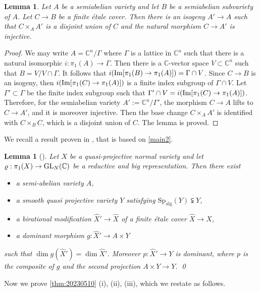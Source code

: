 \documentclass[11pt,english]{smfart}
\theoremstyle{plain}
\newtheorem{lem}[thm]{Lemma}
\theoremstyle{definition}
\theoremstyle{remark}
\numberwithin{equation}{subsection}
\theoremstyle{plain}
\newcommand{\bC}{\mathbb{C}}
\newcommand{\Spalg}{\mathrm{Sp}_{\mathrm{alg}}}
\begin{document}
\begin{lem}\label{lem:finite cover}
	Let $A$ be a semiabelian variety and let $B$ be a semiabelian subvariety of $A$. Let  $C\to B$ be a finite \'etale cover.  Then there is an isogeny $A'\to A$ such that   $C\times_AA'$ is a disjoint union of $C$ and the natural morphism $C\to A'$ is injective. 
\end{lem}
\begin{proof}
	We may write $A=\bC^n/\Gamma$ where $\Gamma$ is a lattice in $\bC^n$ such that there is a natural isomorphic $i: \pi_1(A)\to \Gamma$. Then there is a $\bC$-vector space $V\subset \bC^n$ such that $B=V/V\cap \Gamma$. It follows that $i({\rm Im}[\pi_1(B)\to \pi_1(A)])=\Gamma\cap V$.   Since $C\to B$ is an isogeny, then $i({\rm Im}[\pi_1(C)\to \pi_1(A)])$ is a finite index subgroup of $\Gamma\cap V$.  Let $\Gamma'\subset \Gamma$ be the finite index subgroup such that $\Gamma'\cap V=i({\rm Im}[\pi_1(C)\to \pi_1(A)])$. Therefore, for the semiabelian variety $A':=\bC^n/\Gamma'$,   the morphism $C\to A$  lifts to $C\to A'$, and it is moreover injective. Then the base change $C\times_A A'$ is identified with $C\times_BC$, which is a disjoint union of $C$.  The lemma is proved. 
\end{proof}
We recall a result proven in \cite{CDY22}, that is based on \cref{main2}. 
 \begin{lem}[]\label{lem:202305101} 
	Let $X$ be a quasi-projective normal variety and let $\varrho:\pi_1(X)\to {\rm GL}_N(\bC)$ be a reductive and big representation.  
	Then there exist 
	\begin{itemize}
		\item a semi-abelian variety $A$,
		\item a smooth quasi projective variety $Y$ satisfying $\Spalg(Y)\subsetneqq Y$, 
		\item a birational modification $\widehat{X}'\to \widehat{X}$ of a finite \'etale cover $\widehat{X}\to X$,
		\item a dominant morphism $g:\widehat{X}'\to A\times Y$
	\end{itemize}
	such that $\dim g(\widehat{X}')=\dim \widehat{X}'$.  Moreover $p:\widehat{X}'\to Y$ is dominant, where $p$ is the composite of $g$ and the second projection $A\times Y\to Y$.
	\qed
\end{lem}





Now we prove \cref{thm:20230510} (i), (ii), (iii), which we restate as follows.
\end{document}
